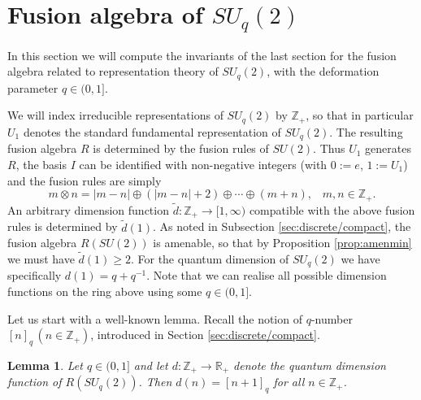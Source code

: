\documentclass[11 pt, leqno]{amsart}
\newcommand{\RR}{\mathbb{R}}
\newcommand{\ZZ}{\mathbb{Z}}
\DeclareMathOperator{\Kaz}{K}
\newtheorem{lemma}[theorem]{Lemma}
\theoremstyle{definition}
\numberwithin{equation}{section}
\begin{document}
	









\section{Fusion algebra of $SU_q(2)$}
\label{Sec:SU} 

In this section we will compute the invariants of the last section for the fusion algebra related to representation theory of $SU_q(2)$, with the deformation parameter $q \in (0,1]$.

We will index irreducible representations of $SU_q(2)$ by $ \ZZ_+$, so that in particular $U_1$ denotes the standard fundamental representation of $SU_q(2)$. 
The resulting fusion algebra $R$ is determined by the fusion rules of $SU(2)$. Thus $U_1$ generates $R$, the basis $I$ can be identified with non-negative integers (with $0:=e$, $1:=U_1$) and the fusion rules are simply
\begin{equation}\label{eq16}
m \otimes n = |m-n| \oplus (|m-n|+2) \oplus \cdots \oplus (m+n), \;\;\; m,n \in \ZZ_+.
\end{equation}
An arbitrary dimension function $\tilde{d}\colon \ZZ_+\to [1, \infty)$ compatible with the above fusion rules is  determined by $\tilde{d}(1)$. As noted in Subsection \ref{sec:discrete/compact}, the fusion algebra $R(SU(2))$ is amenable, so that by Proposition \ref{prop:amenmin} we must have $\tilde{d}(1)\geq 2$. For the quantum dimension of $SU_q(2)$ we have specifically $d(1)=q+ q^{-1}$. Note that we can realise all possible dimension functions on the ring above using some $q \in (0,1]$.

Let us start with a well-known lemma.  Recall the notion of $q$-number $[n]_q\,(n\in\ZZ_+)$, introduced in Section \ref{sec:discrete/compact}.

\begin{lemma} \label{dimensions}
	Let $q \in (0,1]$ and let $d\colon \ZZ_+\to \RR_+$ denote the quantum dimension function of $R(SU_q(2))$. Then $d(n)=[n+1]_q$ for all $n\in\ZZ_+$.
\end{lemma}
\end{document}
